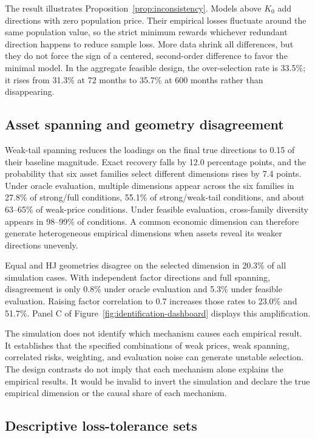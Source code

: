 The result illustrates Proposition~\ref{prop:inconsistency}. Models above $K_0$ add directions with zero population price. Their empirical losses fluctuate around the same population value, so the strict minimum rewards whichever redundant direction happens to reduce sample loss. More data shrink all differences, but they do not force the sign of a centered, second-order difference to favor the minimal model. In the aggregate feasible design, the over-selection rate is 33.5\%; it rises from 31.3\% at 72 months to 35.7\% at 600 months rather than disappearing.

\subsection{Asset spanning and geometry disagreement}

Weak-tail spanning reduces the loadings on the final true directions to 0.15 of their baseline magnitude. Exact recovery falls by 12.0 percentage points, and the probability that six asset families select different dimensions rises by 7.4 points. Under oracle evaluation, multiple dimensions appear across the six families in 27.8\% of strong/full conditions, 55.1\% of strong/weak-tail conditions, and about 63--65\% of weak-price conditions. Under feasible evaluation, cross-family diversity appears in 98--99\% of conditions. A common economic dimension can therefore generate heterogeneous empirical dimensions when assets reveal its weaker directions unevenly.

Equal and HJ geometries disagree on the selected dimension in 20.3\% of all simulation cases. With independent factor directions and full spanning, disagreement is only 0.8\% under oracle evaluation and 5.3\% under feasible evaluation. Raising factor correlation to 0.7 increases those rates to 23.0\% and 51.7\%. Panel C of Figure~\ref{fig:identification-dashboard} displays this amplification.

The simulation does not identify which mechanism causes each empirical result. It establishes that the specified combinations of weak prices, weak spanning, correlated risks, weighting, and evaluation noise can generate unstable selection. The design contrasts do not imply that each mechanism alone explains the empirical results. It would be invalid to invert the simulation and declare the true empirical dimension or the causal share of each mechanism.

\subsection{Descriptive loss-tolerance sets}

